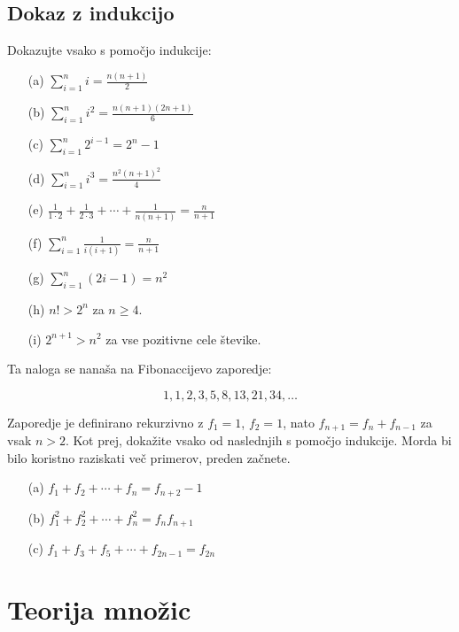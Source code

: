 \documentclass[11pt,paper=b5,footinclude,headinclude]{scrbook} %
\newtheorem{ex}{Vaja\hypertarget{sol:\theex}}[chapter]
\begin{document}

\section{Dokaz z indukcijo}
\begin{ex}
    Dokazujte vsako s pomočjo indukcije:
    \begin{enumerate}
        \item[(a)] $\sum_{i=1}^n i = \frac{n(n + 1)}{2}$
        \item[(b)] $\sum_{i=1}^n i^2 = \frac{n(n + 1)(2n + 1)}{6}$
        \item[(c)] $\sum_{i=1}^n 2^{i-1} = 2^n - 1$
        \item[(d)] $\sum_{i=1}^n i^3 = \frac{n^2(n + 1)^2}{4}$
        \item[(e)] $\frac{1}{1 \cdot 2} + \frac{1}{2 \cdot 3} + \cdots + \frac{1}{n(n + 1)} = \frac{n}{n + 1}$
        \item[(f)] $\sum_{i=1}^n \frac{1}{i(i + 1)} = \frac{n}{n + 1}$
        \item[(g)] $\sum_{i=1}^n (2i - 1) = n^2$
        \item[(h)] $n! > 2^n$ za $n \geq 4$.
        \item[(i)] $2^{n+1} > n^2$ za vse pozitivne cele števike.
    \end{enumerate}
\end{ex}
\begin{ex}
    Ta naloga se nanaša na Fibonaccijevo zaporedje:

\[
1, 1, 2, 3, 5, 8, 13, 21, 34, \ldots
\]

Zaporedje je definirano rekurzivno z $f_1 = 1$, $f_2 = 1$, nato $f_{n+1} = f_n + f_{n-1}$ za vsak $n > 2$. Kot prej, dokažite vsako od naslednjih s pomočjo indukcije. Morda bi bilo koristno raziskati več primerov, preden začnete.
    \begin{enumerate}
        \item[(a)] $f_1 + f_2 + \cdots + f_n = f_{n+2} - 1$
        \item[(b)] $f_1^2 + f_2^2 + \cdots + f_n^2 = f_n f_{n+1}$
        \item[(c)] $f_1 + f_3 + f_5 + \cdots + f_{2n-1} = f_{2n}$
    \end{enumerate}
\end{ex}

\chapter{Teorija množic}
\end{document}
